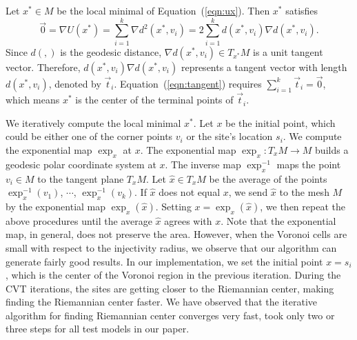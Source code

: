 Let $x^{*}\in M$ be the local minimal of Equation~(\ref{eqn:ux}). Then $x^{*}$ satisfies
\begin{equation}
\vec{0}=\nabla U(x^{*})=\sum_{i=1}^{k}\nabla d^2(x^{*},v_i)=2\sum_{i=1}^{k}d(x^{*},v_i)\nabla d(x^{*},v_i).
\label{eqn:tangent}
\end{equation}
Since $d(,)$ is the geodesic distance, $\nabla d(x^{*},v_i) \in T_{x^{*}}M$ is a unit tangent vector.
Therefore, $d(x^{*},v_i)\nabla d(x^{*},v_i)$ represents a tangent vector with length $d(x^{*},v_i)$, denoted by $\vec{t}_i$.
Equation~(\ref{eqn:tangent}) requires $\sum_{i=1}^k \vec{t}_i=\vec{0}$, which means $x^{*}$ is the center of the terminal points of $\vec{t}_i$.

We iteratively compute the local minimal $x^{*}$. Let $x$ be the
initial point, which could be either one of the corner points $v_i$
or the site's location $s_i$.
 We compute the exponential map $\exp_{x}$ at $x$. The exponential map
$\exp_{x}:T_{x}M\rightarrow M$ builds a geodesic polar coordinate
system at $x$. The inverse map $\exp^{-1}_{x}$ maps the point
$v_i\in M$ to the tangent plane $T_{x}M$. Let $\hat{x}\in T_{x}M$ be
the average of the points $\exp^{-1}_{x}(v_1)$, $\cdots$,
$\exp^{-1}_{x}(v_k)$. If $\hat{x}$ does not equal $x$, we send
$\hat{x}$ to the mesh $M$ by the exponential map
$\exp_{x}(\hat{x})$. Setting $x=\exp_{x}(\hat{x})$, we then repeat
the above procedures until the average $\hat{x}$ agrees with $x$.
Note that the exponential map, in general, does not preserve the
area. However, when the Voronoi cells are small with respect to the
injectivity radius\cite{JMIC}, we observe that our algorithm can
generate fairly good results. In our implementation, we set the
initial point $x=s_i$, which is the center of the Voronoi region in
the previous iteration. During the CVT iterations, the sites are
getting closer to the Riemannian center, making finding the
Riemannian center faster. We have observed that the iterative
algorithm for finding Riemannian center converges very fast, took
only two or three steps for all test models in our paper.

